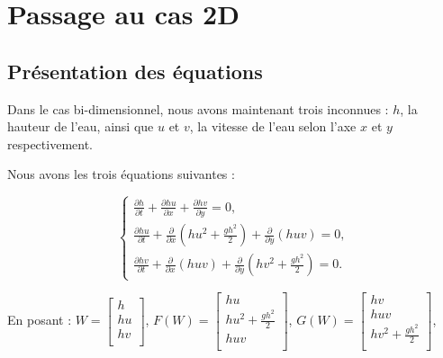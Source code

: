 \documentclass[
11pt, %
francais, %
singlespacing, %
headsepline, %
f%
]{MastersDoctoralThesis} %
\theoremstyle{definition}
\begin{document}

\section{Passage au cas 2D}

\subsection{Présentation des équations}

Dans le cas bi-dimensionnel, nous avons maintenant trois inconnues : $h$, la hauteur de l'eau, ainsi que $u$ et $v$, la vitesse de l'eau selon l'axe $x$ et $y$ respectivement.

Nous avons les trois équations suivantes : 

$$\left\{
    \begin{array}{lll}
        \frac{\partial h}{\partial t} + \frac{\partial hu}{\partial x} + \frac{\partial hv}{\partial y} = 0, \\
        \frac{\partial hu}{\partial t} + \frac{\partial}{\partial x} ( hu^2 + \frac{gh^2}{2} ) + \frac{\partial}{\partial y} ( huv  ) = 0, \\
        \frac{\partial hv}{\partial t} + \frac{\partial}{\partial x} ( huv ) + \frac{\partial}{\partial y} ( hv^2 + \frac{gh^2}{2} ) = 0.
    \end{array}
\right.
$$

En posant : 
$ W = \left[ {\begin{array}{c}   h \\    hu \\    hv \\  \end{array} } \right] $, 
$ F(W) = \left[ {\begin{array}{c}   hu \\    hu^2 + \frac{gh^2}{2}  \\    huv  \\  \end{array} } \right] $,
$ G(W) = \left[ {\begin{array}{c}   hv \\    huv  \\    hv^2 + \frac{gh^2}{2} \\  \end{array} } \right] $,
\end{document}
